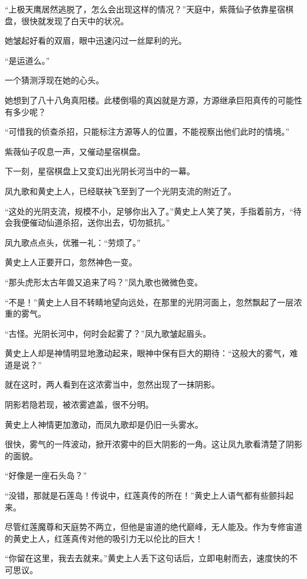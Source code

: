 
\begin{this_body}

“上极天鹰居然逃脱了，怎么会出现这样的情况？”天庭中，紫薇仙子依靠星宿棋盘，很快就发现了白天中的状况。

她皱起好看的双眉，眼中迅速闪过一丝犀利的光。

“是运道么。”

一个猜测浮现在她的心头。

她想到了八十八角真阳楼。此楼倒塌的真凶就是方源，方源继承巨阳真传的可能性有多少呢？

“可惜我的侦查杀招，只能标注方源等人的位置，不能视察出他们此时的情境。”

紫薇仙子叹息一声，又催动星宿棋盘。

下一刻，星宿棋盘上又变幻出光阴长河当中的一幕。

凤九歌和黄史上人，已经联袂飞至到了一个光阴支流的附近了。

“这处的光阴支流，规模不小，足够你出入了。”黄史上人笑了笑，手指着前方，“待会我便催动仙道杀招，送你出去，切勿抵抗。”

凤九歌点点头，优雅一礼：“劳烦了。”

黄史上人正要开口，忽然神色一变。

“那头虎形太古年兽又追来了吗？”凤九歌也微微色变。

“不是！”黄史上人目不转睛地望向远处，在那里的光阴河面上，忽然飘起了一层浓重的雾气。

“古怪。光阴长河中，何时会起雾了？”凤九歌皱起眉头。

黄史上人却是神情明显地激动起来，眼神中保有巨大的期待：“这般大的雾气，难道是说？”

就在这时，两人看到在这浓雾当中，忽然出现了一抹阴影。

阴影若隐若现，被浓雾遮盖，很不分明。

黄史上人神情更加激动，而凤九歌却是仍旧一头雾水。

很快，雾气的一阵波动，掀开浓雾中的巨大阴影的一角。这让凤九歌看清楚了阴影的面貌。

“好像是一座石头岛？”

“没错，那就是石莲岛！传说中，红莲真传的所在！”黄史上人语气都有些颤抖起来。

尽管红莲魔尊和天庭势不两立，但他是宙道的绝代巅峰，无人能及。作为专修宙道的黄史上人，红莲真传对他的吸引力无以伦比的巨大！

“你留在这里，我去去就来。”黄史上人丢下这句话后，立即电射而去，速度快的不可思议。


\end{this_body}
